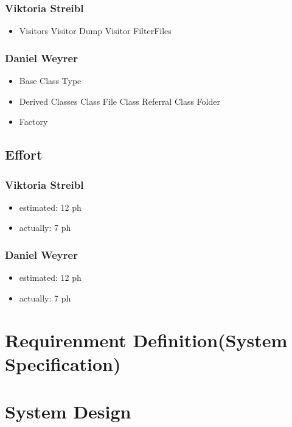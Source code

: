 \subsubsection{Viktoria Streibl}
\begin{itemize}
	\item Visitors
	\subitem Visitor Dump
	\subitem Visitor FilterFiles			
\end{itemize}

\subsubsection{Daniel Weyrer}
\begin{itemize}
	\item Base Class Type
	\item Derived Classes
		\subitem Class File
		\subitem Class Referral
		\subitem Class Folder
	\item Factory
\end{itemize}

\subsection{Effort}

\subsubsection {Viktoria Streibl}
\begin{itemize}
	\item estimated: 12 ph 
	\item actually: 7 ph
\end{itemize}

\subsubsection {Daniel Weyrer}
\begin{itemize}
	\item estimated: 12 ph 
	\item actually: 7 ph
\end{itemize}

\section{Requirenment Definition(System Specification)}

\section{System Design}
\newpage
